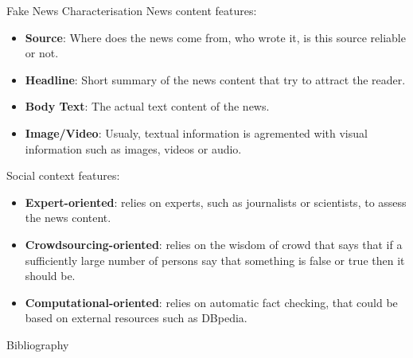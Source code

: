 \documentclass{beamer}
\begin{document}
  \begin{frame}[allowframebreaks]{Fake News Characterisation}
News content features:
  	\begin{itemize}
 \item \textbf{Source}: Where does the news come from, who wrote it, is this source reliable or not.
 \item \textbf{Headline}: Short summary of the news content that try to attract the reader.
 \item \textbf{Body Text}: The actual text content of the news.
 \item \textbf{Image/Video}: Usualy, textual information is agremented with visual information such as images, videos or audio.  
\end{itemize}
	\newpage
  Social context features:
  \begin{itemize}
 \item \textbf{Expert-oriented}: relies on experts, such as journalists or scientists, to assess the news content.
 \item \textbf{Crowdsourcing-oriented}: relies on the wisdom of crowd that says that if a sufficiently large number of persons say that something is false or true then it should be.
 \item \textbf{Computational-oriented}: relies on automatic fact checking, that could be based on external resources such as DBpedia.
\end{itemize}
  \end{frame}
  \begin{frame}[allowframebreaks]{Bibliography}
    
	
  \end{frame}
\end{document}
